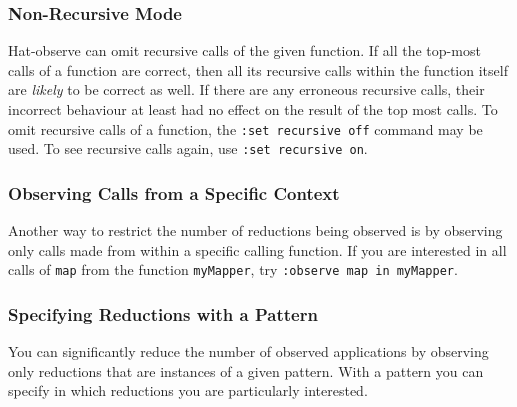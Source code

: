\documentclass[12pt]{article}
\newcommand{\com}[1]{\texttt{#1}}
\begin{document}
\subsubsection{Non-Recursive Mode}

Hat-observe can omit recursive calls of the given function.  If all the
top-most calls of a function are correct, then all its recursive calls
within the function itself are \emph{likely} to be correct as well. If
there are any erroneous recursive calls, their incorrect behaviour
at least had no effect on the result of the top most calls. To omit
recursive calls of a function, the \com{:set recursive off} command may
be used.  To see recursive calls again, use \com{:set recursive on}.

%
%

\subsubsection{Observing Calls from a Specific Context}

Another way to restrict the number of reductions being observed is
by observing only calls made from within a specific calling function.
If you are interested in all calls of \texttt{map} from the function
\texttt{myMapper}, try \com{:observe map in myMapper}.

\subsubsection{Specifying Reductions with a Pattern}

You can significantly reduce the number of observed applications
by observing only reductions that are instances of a given pattern.
With a pattern you can specify in which reductions you are particularly
interested.
\end{document}
